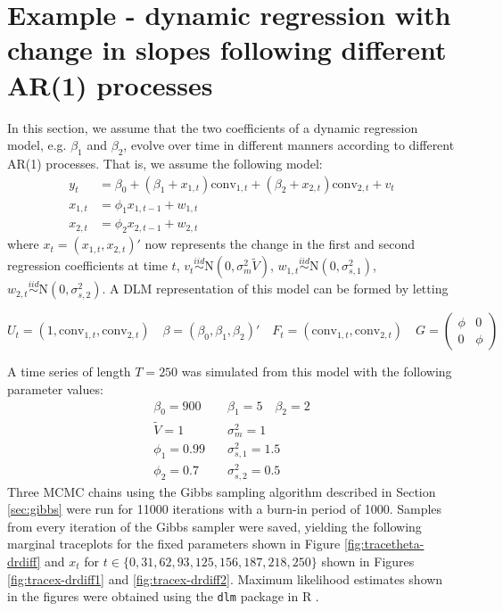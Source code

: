\documentclass{article}
\begin{document}
\section{Example - dynamic regression with change in slopes following different AR(1) processes}

In this section, we assume that the two coefficients of a dynamic regression model, e.g. $\beta_1$ and $\beta_2$, evolve over time in different manners according to different AR(1) processes. That is, we assume the following model:
\begin{align*}
y_t &= \beta_0 + (\beta_1 + x_{1,t})\mbox{conv}_{1,t} + (\beta_2 + x_{2,t})\mbox{conv}_{2,t} + v_t \\
x_{1,t} &= \phi_1 x_{1,t-1} + w_{1,t} \\
x_{2,t} &= \phi_2 x_{2,t-1} + w_{2,t}
\end{align*}
\noindent where $x_t = (x_{1,t}, x_{2,t})'$ now represents the change in the first and second regression coefficients at time $t$, $v_t \stackrel{iid}{\sim} \mbox{N}(0,\sigma^2_m\tilde{V})$, $w_{1,t} \stackrel{iid}{\sim} \mbox{N}(0,\sigma^2_{s,1})$, $w_{2,t} \stackrel{iid}{\sim} \mbox{N}(0,\sigma^2_{s,2})$. A DLM representation of this model can be formed by letting

\begin{equation}
U_t = (1, \mbox{conv}_{1,t}, \mbox{conv}_{2,t}) \quad \beta = (\beta_0,\beta_1,\beta_2)' \quad F_t = (\mbox{conv}_{1,t}, \mbox{conv}_{2,t}) \quad G = \left( \begin{array}{cc} \phi & 0 \\ 0 & \phi \end{array} \right) \label{eqn:dr}
\end{equation}

A time series of length $T = 250$ was simulated from this model with the following parameter values:
\begin{align*}
\beta_0 = 900 &\quad \beta_1 = 5 \quad \beta_2 = 2 \\
\tilde{V} = 1 &\quad \sigma_m^2 = 1 \\
\phi_1 = 0.99 &\quad \sigma^2_{s,1} = 1.5 \\
\phi_2 = 0.7 &\quad \sigma^2_{s,2} = 0.5
\end{align*}
Three MCMC chains using the Gibbs sampling algorithm described in Section \ref{sec:gibbs} were run for 11000 iterations with a burn-in period of 1000. Samples from every iteration of the Gibbs sampler were saved, yielding the following marginal traceplots for the fixed parameters shown in Figure \ref{fig:tracetheta-drdiff} and $x_t$ for $t \in \{0, 31, 62, 93, 125, 156, 187, 218, 250\}$ shown in Figures \ref{fig:tracex-drdiff1} and \ref{fig:tracex-drdiff2}. Maximum likelihood estimates shown in the figures were obtained using the {\tt dlm} package in R \citep{petris2009dynamic}.
\end{document}
